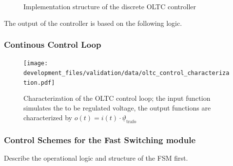 \begin{figure}[htb!]
        \centering
        \caption[Implementation structure of the discrete OLTC controller]{Implementation structure of the discrete OLTC controller}
        \label{fig:discrete-oltc-implementation}
\end{figure}

The output of the controller is based on the following logic.


% 

\subsubsection{Continous Control Loop}

\begin{figure}[htb!]
        \centering
        \texttt{[image: development\_files/validation/data/oltc\_control\_characterization.pdf]}
        \caption[Characterization of the OLTC control loops]{Characterization of the OLTC control loop; the input function simulates the to be regulated voltage, the output functions are characterized by $o(t)=i(t) \cdot \underline{\vartheta}_\mathrm{trafo}$}
        \label{fig:oltc-control-characterization}
\end{figure}

\subsubsection{Control Schemes for the Fast Switching module}


Describe the operational logic and structure of the \acf{FSM} first.

